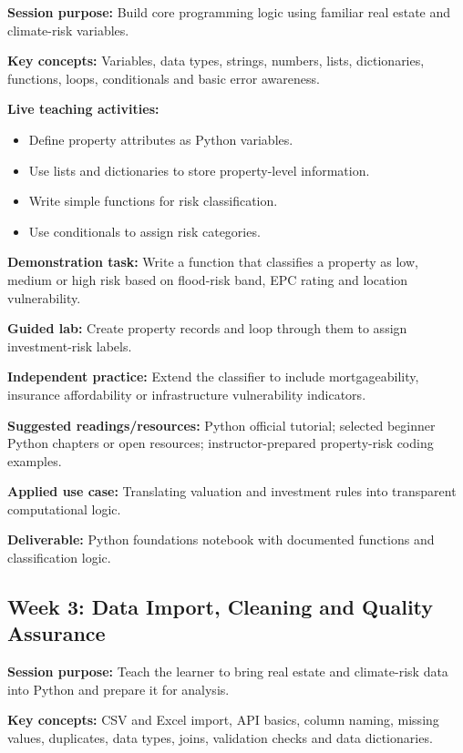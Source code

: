 \documentclass[
  a4paper,
]{article}
\providecommand{\tightlist}{%
  \setlength{\itemsep}{0pt}\setlength{\parskip}{0pt}}
\begin{document}
\textbf{Session purpose:} Build core programming logic using familiar
real estate and climate-risk variables.

\textbf{Key concepts:} Variables, data types, strings, numbers, lists,
dictionaries, functions, loops, conditionals and basic error awareness.

\textbf{Live teaching activities:}

\begin{itemize}
\tightlist
\item
  Define property attributes as Python variables.
\item
  Use lists and dictionaries to store property-level information.
\item
  Write simple functions for risk classification.
\item
  Use conditionals to assign risk categories.
\end{itemize}

\textbf{Demonstration task:} Write a function that classifies a property
as low, medium or high risk based on flood-risk band, EPC rating and
location vulnerability.

\textbf{Guided lab:} Create property records and loop through them to
assign investment-risk labels.

\textbf{Independent practice:} Extend the classifier to include
mortgageability, insurance affordability or infrastructure vulnerability
indicators.

\textbf{Suggested readings/resources:} Python official tutorial;
selected beginner Python chapters or open resources; instructor-prepared
property-risk coding examples.

\textbf{Applied use case:} Translating valuation and investment rules
into transparent computational logic.

\textbf{Deliverable:} Python foundations notebook with documented
functions and classification logic.

\subsection{Week 3: Data Import, Cleaning and Quality
Assurance}\label{week-3-data-import-cleaning-and-quality-assurance}

\textbf{Session purpose:} Teach the learner to bring real estate and
climate-risk data into Python and prepare it for analysis.

\textbf{Key concepts:} CSV and Excel import, API basics, column naming,
missing values, duplicates, data types, joins, validation checks and
data dictionaries.
\end{document}
